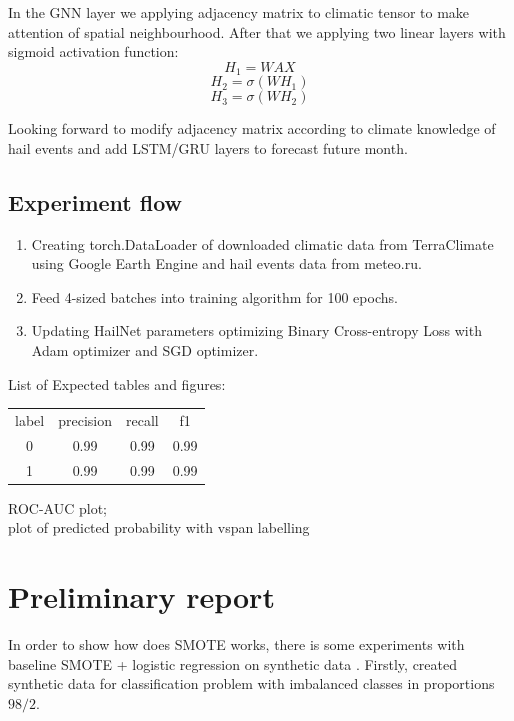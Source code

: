 \documentclass{article}
\begin{document}
\newpage
In the GNN layer we applying adjacency matrix to climatic tensor to make attention of spatial neighbourhood. After that we applying two linear layers with sigmoid activation function:
\begin{equation}
    H_1 = WAX
\end{equation}
\begin{equation}
    H_2 = \sigma(WH_1)
\end{equation}
\begin{equation}
    H_3 = \sigma(WH_2)
\end{equation}

Looking forward to modify adjacency matrix according to climate knowledge of hail events and add LSTM/GRU layers to forecast future month.


\subsection{Experiment flow}
\begin{enumerate}
    \item  Creating torch.DataLoader of downloaded climatic data from TerraClimate using Google Earth Engine and hail events data from meteo.ru.
    \item Feed 4-sized batches into training algorithm for 100 epochs.
    \item Updating HailNet parameters optimizing Binary Cross-entropy Loss with Adam optimizer and SGD optimizer.
\end{enumerate}
List of Expected tables and figures:

\begin{tabular}{c|c|c|c}
    label & precision & recall & f1 \\
    0 & 0.99 & 0.99 & 0.99 \\
    1 & 0.99 & 0.99 & 0.99
\end{tabular}

ROC-AUC plot;\\
plot of predicted probability with vspan labelling\\
\section{Preliminary report}
In order to show how does SMOTE works, there is some experiments with baseline SMOTE + logistic regression on synthetic data . Firstly, created synthetic data for classification problem with imbalanced classes in proportions $98/2$.
\end{document}
